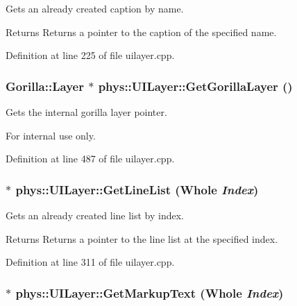 Gets an already created caption by name. 

\begin{DoxyReturn}{Returns}
Returns a pointer to the caption of the specified name. 
\end{DoxyReturn}


Definition at line 225 of file uilayer.cpp.

\hypertarget{classphys_1_1UILayer_a0f1d04779794d4401714b0d8fa90cab5}{
\subsubsection[{GetGorillaLayer}]{\setlength{\rightskip}{0pt plus 5cm}Gorilla::Layer $\ast$ phys::UILayer::GetGorillaLayer ()}}
\label{da/d48/classphys_1_1UILayer_a0f1d04779794d4401714b0d8fa90cab5}


Gets the internal gorilla layer pointer. 

\begin{DoxyInternal}{For internal use only.}
\end{DoxyInternal}


Definition at line 487 of file uilayer.cpp.

\hypertarget{classphys_1_1UILayer_abba7c9e3e937db7091254b2683af5ea1}{
\subsubsection[{GetLineList}]{ $\ast$ phys::UILayer::GetLineList ({\bf Whole} {\em Index})}}
\label{da/d48/classphys_1_1UILayer_abba7c9e3e937db7091254b2683af5ea1}


Gets an already created line list by index. 

\begin{DoxyReturn}{Returns}
Returns a pointer to the line list at the specified index. 
\end{DoxyReturn}


Definition at line 311 of file uilayer.cpp.

\hypertarget{classphys_1_1UILayer_a2f40efc62324c5d2d5c1282f2ea6088d}{
\subsubsection[{GetMarkupText}]{ $\ast$ phys::UILayer::GetMarkupText ({\bf Whole} {\em Index})}}
\label{da/d48/classphys_1_1UILayer_a2f40efc62324c5d2d5c1282f2ea6088d}


